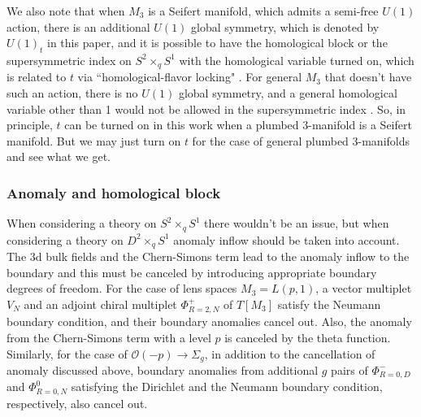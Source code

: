 \documentclass[11pt,hyper,a4paper]{article}
\begin{document}
We also note that when $M_3$ is a Seifert manifold, which admits a semi-free $U(1)$ action, there is an additional $U(1)$ global symmetry, which is denoted by $U(1)_t$ in this paper, and it is possible to have the homological block or the supersymmetric index on $S^2 \times_q S^1$ with the homological variable turned on, which is related to $t$ via ``homological-flavor locking" \cite{AS-refinedCS, Gukov-Putrov-Vafa, Gukov-Pei-Putrov-Vafa}.
For general $M_3$ that doesn't have such an action, there is no $U(1)$ global symmetry, and a general homological variable other than 1 would not be allowed in the supersymmetric index \cite{Witten-M5knots}.
So, in principle, $t$ can be turned on in this work when a plumbed 3-manifold is a Seifert manifold.
But we may just turn on $t$ for the case of general plumbed 3-manifolds and see what we get.








\subsubsection*{Anomaly and homological block}

When considering a theory on $S^2\times_q S^1$ there wouldn't be an issue, but when considering a theory on $D^2 \times_q S^1$ anomaly inflow should be taken into account.
The 3d bulk fields and the Chern-Simons term lead to the anomaly inflow to the boundary and this must be canceled by introducing appropriate boundary degrees of freedom.
For the case of lens spaces $M_3 = L(p,1)$, a vector multiplet $V_N$ and an adjoint chiral multiplet $\Phi_{R=2,N}^{+}$ of $T[M_3]$ satisfy the Neumann boundary condition, and their boundary anomalies cancel out.
Also, the anomaly from the Chern-Simons term with a level $p$ is canceled by the theta function.
Similarly, for the case of $\mathcal{O}(-p) \rightarrow \Sigma_g$, in addition to the cancellation of anomaly discussed above, boundary anomalies from additional $g$ pairs of $\Phi_{R=0,D}^{-}$ and $\Phi_{R=0,N}^{0}$ satisfying the Dirichlet and the Neumann boundary condition, respectively, also cancel out.
\end{document}
